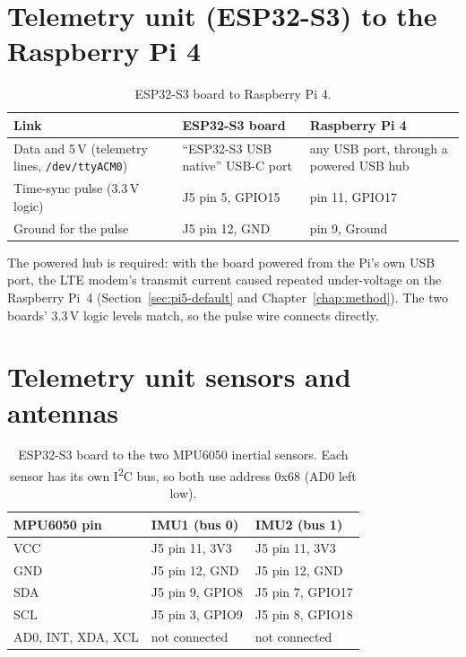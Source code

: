 \section{Telemetry unit (ESP32-S3) to the Raspberry Pi 4}

\begin{table}[htbp]
\centering
\caption{ESP32-S3 board to Raspberry Pi 4.}
\label{tab:wiring-esp-pi}
\begin{tabular}{|p{3.2cm}|p{4.2cm}|p{4.2cm}|}
\hline
\textbf{Link} & \textbf{ESP32-S3 board} & \textbf{Raspberry Pi 4} \\ \hline
Data and 5\,V (telemetry lines, \texttt{/dev/ttyACM0}) & ``ESP32-S3 USB native'' USB-C port & any USB port, through a powered USB hub \\ \hline
Time-sync pulse (3.3\,V logic) & J5 pin 5, GPIO15 & pin 11, GPIO17 \\ \hline
Ground for the pulse & J5 pin 12, GND & pin 9, Ground \\ \hline
\end{tabular}
\end{table}

The powered hub is required: with the board powered from the Pi's own USB port, the LTE modem's transmit current caused repeated under-voltage on the Raspberry Pi~4 (Section~\ref{sec:pi5-default} and Chapter~\ref{chap:method}). The two boards' 3.3\,V logic levels match, so the pulse wire connects directly.

\section{Telemetry unit sensors and antennas}

\begin{table}[htbp]
\centering
\caption{ESP32-S3 board to the two MPU6050 inertial sensors. Each sensor has its own I\textsuperscript{2}C bus, so both use address 0x68 (AD0 left low).}
\label{tab:wiring-imu}
\begin{tabular}{|l|l|l|}
\hline
\textbf{MPU6050 pin} & \textbf{IMU1 (bus 0)} & \textbf{IMU2 (bus 1)} \\ \hline
VCC & J5 pin 11, 3V3 & J5 pin 11, 3V3 \\ \hline
GND & J5 pin 12, GND & J5 pin 12, GND \\ \hline
SDA & J5 pin 9, GPIO8 & J5 pin 7, GPIO17 \\ \hline
SCL & J5 pin 3, GPIO9 & J5 pin 8, GPIO18 \\ \hline
AD0, INT, XDA, XCL & not connected & not connected \\ \hline
\end{tabular}
\end{table}

